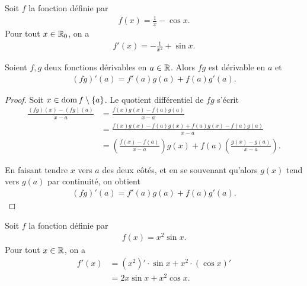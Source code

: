 \documentclass[main.tex]{subfiles}
\begin{document}
\begin{example}
    Soit $f$ la fonction définie par 
    \begin{align}
        f(x) = \frac{1}{x} - \cos x.
    \end{align}
    Pour tout $x \in \mathbb{R}_0$, on a 
    \begin{align}
        f'(x) = -\frac{1}{x^2} + \sin x.
    \end{align}
\end{example}

\begin{proposition}

    Soient $f, g$ deux fonctions dérivables en $a \in \mathbb{R}$.
    Alors $f g$ est dérivable en $a$ et
    \begin{align}
        (f g)'(a) = f'(a) g(a) + f(a) g'(a).
    \end{align}
\end{proposition}
\begin{proof}
    Soit $x \in \operatorname{dom} f \setminus \{a\}$.
    Le quotient différentiel de $f g$ s'écrit
    \begin{align}
        \frac {(f g)(x) - (f g)(a)} {x - a}
        &= \frac {f(x) g(x) - f(a) g(a)} {x - a}\\
        &= \frac {f(x) g(x) - f(a) g(x) + f(a) g(x) - f(a) g(a)} {x - a}\\
        &= \left(\frac {f(x) - f(a)} {x - a}\right) g(x) + f(a) \left(\frac {g(x) - g(a)} {x - a}\right).
    \end{align}

    En faisant tendre $x$ vers $a$ des deux côtés,
    et en se souvenant qu'alors $g(x)$ tend vers $g(a)$ par continuité,
    on obtient
    \begin{align}
        (f g)'(a) = f'(a) g(a) + f(a) g'(a).
    \end{align}
\end{proof}

\begin{example}
    Soit $f$ la fonction définie par 
    \begin{align}
        f(x) = x^2 \sin x.
    \end{align}
    Pour tout $x \in \mathbb{R}$, on a 
    \begin{align}
        f'(x)
        &= (x^2)' \cdot \sin x + x^2 \cdot (\cos x)'\\
        &=2x \sin x + x^2 \cos x.
    \end{align}
\end{example}
\end{document}

